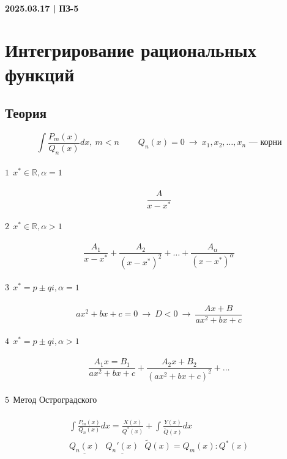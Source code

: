 \documentclass{article}
\begin{document}
\newpage
\paragraph{2025.03.17 | ПЗ-5}

\section{Интегрирование рациональных функций}

\subsection{Теория}
\[
    \int \frac{P_m(x)}{Q_n(x)} dx,~ m < n ~~~~~~~~~~
    Q_n(x) = 0 ~\rightarrow~ x_1, x_2, \dots, x_n \text{ --- корни}
\]
\paragraph{$\boxed{1}~~ x^* \in \mathbb{R}, \alpha = 1$}
\[
    \frac{A}{x - x^*}
\]
\paragraph{$\boxed{2}~~ x^* \in \mathbb{R}, \alpha > 1$}
\[
    \frac{A_1}{x - x^*} + \frac{A_2}{(x - x^*)^2} + \dots + \frac{A_{\alpha}}{(x - x^*)^{\alpha}}
\]
\paragraph{$\boxed{3}~~ x^* = p \pm qi, \alpha = 1$}
\[
    ax^2 + bx + c = 0 ~\rightarrow~ D < 0 ~\rightarrow~ \frac{Ax + B}{ax^2 + bx + c}
\]
\paragraph{$\boxed{4}~~ x^* = p \pm qi, \alpha > 1$}
\[
    \frac{A_1x = B_1}{ax^2 + bx + c} + \frac{A_2x + B_2}{(ax^2 + bx + c)^2} + \dots
\]
\paragraph{$\boxed{5}~~ \text{Метод Остроградского}$}
\begin{gather*}
    \int \frac{P_m(x)}{Q_n(x)} dx = \frac{X(x)}{Q^*(x)} + \int \frac{Y(x)}{\widetilde{Q}(x)} dx \\
    \underline{Q_n(x)} ~~~ \underline{Q_n'(x)} ~~~ \widetilde{Q}(x) = Q_m(x): Q^*(x)
\end{gather*}
\end{document}
